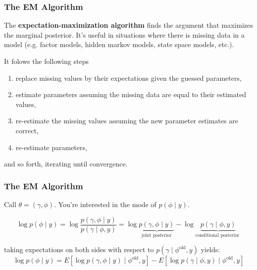 \documentclass{beamer}
\begin{document}
\begin{frame}[fragile]
\frametitle{The EM Algorithm}

The {\bf expectation-maximization algorithm} finds the argument that maximizes the marginal posterior. It's useful in situations where there is missing data in a model (e.g. factor models, hidden markov models, state space models, etc.). 
\newline

It folows the following steps
\begin{enumerate}
\item replace missing values by their expectations given the guessed parameters, 
\item estimate parameters assuming the missing data are equal to their estimated values, 
\item re-estimate the missing values assuming the new parameter estimates are correct,
\item re-estimate parameters, 
\end{enumerate}
and so forth, iterating until convergence.

\end{frame}


\begin{frame}[fragile]
\frametitle{The EM Algorithm}

Call $\theta = (\gamma, \phi)$. You're interested in the mode of $p(\phi \mid y)$.
\newline

$$
\log p(\phi \mid y) = \log \frac{p(\gamma, \phi \mid y)}{p(\gamma \mid \phi, y)} = \log \underbrace{p(\gamma, \phi \mid y)}_{ \text{joint posterior} } - \log \underbrace{p(\gamma \mid \phi, y)}_{\text{conditional posterior }}
$$
\pause

taking expectations on both sides with respect to $p(\gamma \mid \phi^{\text{old}}, y)$ yields:
$$
\log p(\phi \mid y) =  E\left[ \log p(\gamma, \phi \mid y) \mid \phi^{\text{old}}, y \right] - E\left[\log p(\gamma \mid \phi, y) \mid \phi^{\text{old}}, y \right]
$$




\end{frame}
\end{document}
